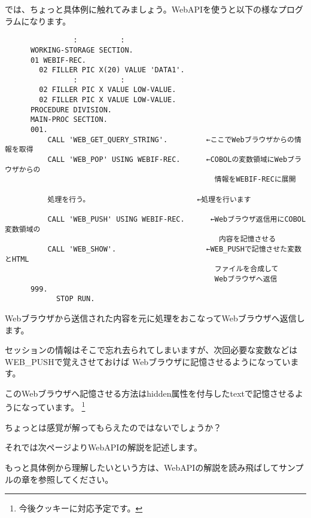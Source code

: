 

\vspace{1em}

では、ちょっと具体例に触れてみましょう。WebAPIを使うと以下の様なプログラムになります。

\begin{verbatim}
                :          :
      WORKING-STORAGE SECTION.
      01 WEBIF-REC.
        02 FILLER PIC X(20) VALUE 'DATA1'.
                :          :
        02 FILLER PIC X VALUE LOW-VALUE.
        02 FILLER PIC X VALUE LOW-VALUE.
      PROCEDURE DIVISION.
      MAIN-PROC SECTION.
      001.
          CALL 'WEB_GET_QUERY_STRING'.         ←ここでWebブラウザからの情報を取得
          CALL 'WEB_POP' USING WEBIF-REC.      ←COBOLの変数領域にWebブラウザからの
                                                 情報をWEBIF-RECに展開

          処理を行う。                         ←処理を行います

          CALL 'WEB_PUSH' USING WEBIF-REC.      ←Webブラウザ返信用にCOBOL変数領域の
                                                  内容を記憶させる
          CALL 'WEB_SHOW'.                     ←WEB_PUSHで記憶させた変数とHTML
                                                 ファイルを合成して
                                                 Webブラウザへ返信
      999.
            STOP RUN.
\end{verbatim}
      

Webブラウザから送信された内容を元に処理をおこなってWebブラウザへ返信します。

セッションの情報はそこで忘れ去られてしまいますが、次回必要な変数などはWEB\_PUSHで覚えさせておけば
Webブラウザに記憶させるようになっています。

このWebブラウザへ記憶させる方法はhidden属性を付与したtextで記憶させるようになっています。
\footnote{今後クッキーに対応予定です。}

ちょっとは感覚が解ってもらえたのではないでしょうか？

それでは次ページよりWebAPIの解説を記述します。

もっと具体例から理解したいという方は、WebAPIの解説を読み飛ばしてサンプルの章を参照してください。

%


